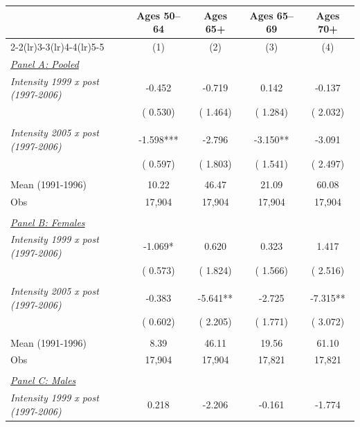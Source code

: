 \begin{tabular}{lcccc} \hline \hline
& \multicolumn{1}{c}{Ages 50--64} & \multicolumn{1}{c}{Ages 65+} & \multicolumn{1}{c}{Ages 65--69} & \multicolumn{1}{c}{Ages 70+} \\ 
\cmidrule(lr){2-2}\cmidrule(lr){3-3}\cmidrule(lr){4-4}\cmidrule(lr){5-5}
& \multicolumn{1}{c}{(1)} & \multicolumn{1}{c}{(2)} & \multicolumn{1}{c}{(3)} & \multicolumn{1}{c}{(4)} \\ \toprule
\underline{\textit{Panel A: Pooled}} \\ 
\textit{Intensity 1999 x post (1997-2006)} &       -0.452 &       -0.719 &        0.142 &       -0.137 \\ 
 & (       0.530) & (       1.464) & (       1.284) & (       2.032) \\ 
  & & & & \\ 
\textit{Intensity 2005 x post (1997-2006)} &       -1.598*** &       -2.796 &       -3.150** &       -3.091 \\ 
 & (       0.597) & (       1.803) & (       1.541) & (       2.497) \\ 
  & & & & \\ 
Mean (1991-1996) &        10.22 &        46.47 &        21.09 &        60.08 \\ 
Obs &       17,904 &       17,904 &       17,904 &       17,904 \\ 
  & & & & \\ 
\underline{\textit{Panel B: Females}} \\ 
\textit{Intensity 1999 x post (1997-2006)} &       -1.069* &        0.620 &        0.323 &        1.417 \\ 
 & (       0.573) & (       1.824) & (       1.566) & (       2.516) \\ 
  & & & & \\ 
\textit{Intensity 2005 x post (1997-2006)} &       -0.383 &       -5.641** &       -2.725 &       -7.315** \\ 
 & (       0.602) & (       2.205) & (       1.771) & (       3.072) \\ 
  & & & & \\ 
Mean (1991-1996) &         8.39 &        46.11 &        19.56 &        61.10 \\ 
Obs &       17,904 &       17,904 &       17,821 &       17,821 \\ 
  & & & & \\ 
\underline{\textit{Panel C: Males}} \\ 
\textit{Intensity 1999 x post (1997-2006)} &        0.218 &       -2.206 &       -0.161 &       -1.774 \\ 

\end{tabular}
